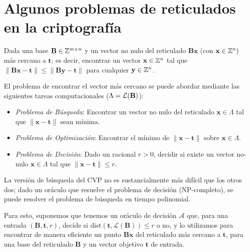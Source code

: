\section{Algunos problemas de reticulados en la criptografía}
\begin{frame}
\begin{definition}
Dada una base $\mathbf{B} \in \mathbb{Z}^{m \times n}$ y un vector no nulo del reticulado $\mathbf{Bx}$ (con $\mathbf{x} \in \mathbb{Z}^n)$ más cercano a $\mathbf{t}$; es decir, encontrar un vector $\mathbf{x} \in \mathbb{Z}^n$ tal que $\|\mathbf{Bx} - \mathbf{t}\| \leq \|\mathbf{By} - \mathbf{t}\|$ para cualquier $\mathbf{y} \in \mathbb{Z}^n$.
\end{definition}

El problema de encontrar el vector más cercano se puede abordar mediante las siguientes tareas computacionales ($\Lambda = \mathcal{L}(\mathbf{B})$):
\begin{itemize}
    \item \textit{Problema de Búsqueda}: Encontrar un vector no nulo del reticulado $\mathbf{x} \in \Lambda$ tal que $\|\mathbf{x}-\mathbf{t}\|$ sean mínima.
    \item \textit{Problema de Optimización}: Encontrar el mínimo de $\|\mathbf{x}-\mathbf{t}\|$ sobre $\mathbf{x} \in \Lambda$.
    \item \textit{Problema de Decisión}: Dado un racional $r>0$, decidir si existe un vector no-nulo $\mathbf{x} \in \Lambda$ tal que $\|\mathbf{x}-\mathbf{t}\| \leq r$.
\end{itemize}
\end{frame}

\begin{frame}

\begin{remark}
 La versión de búsqueda del CVP no es sustancialmente más difícil que los otros dos; dado un oráculo que resuelve el problema de decisión (NP-completo), se puede resolver el problema de búsqueda en tiempo polinomial.   
\end{remark} 

Para esto, suponemos que tenemos un oráculo de decisión $\mathcal{A}$ que, para una entrada $(\mathbf{B},\mathbf{t},r)$, decide si $\mathrm{dist}(\mathbf{t}, \mathcal{L}(\mathbf{B})) \leq r$ o no, y lo utilizamos para encontrar de manera eficiente un punto $\mathbf{Bx}$ del reticulado más cercano a $\mathbf{t}$, para una base del reticulado $\mathbf{B}$ y un vector objetivo $\mathbf{t}$ de entrada.
\end{frame}

